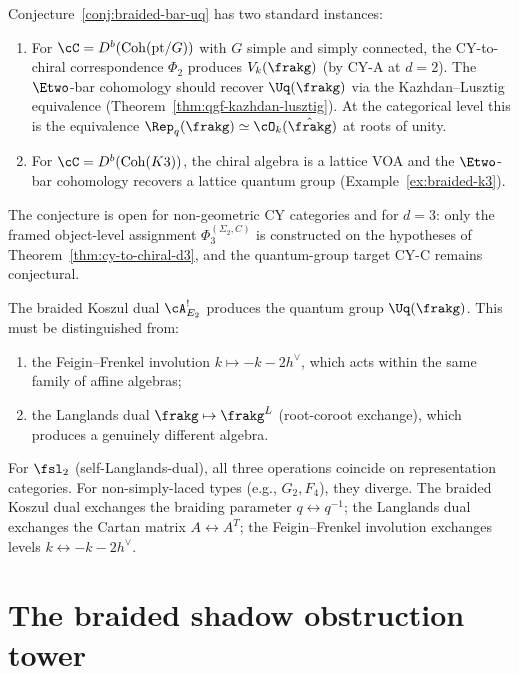 \begin{remark}
\label{rem:braided-bar-evidence}
Conjecture~\ref{conj:braided-bar-uq} has two standard instances:
\begin{enumerate}[label=(\roman*)]
 \item For $\cC = D^b(\mathrm{Coh}(\mathrm{pt}/G))$ with $G$ simple
 and simply connected, the CY-to-chiral correspondence $\Phi_2$ produces
 $V_k(\frakg)$ (by CY-A at $d = 2$). The $\Etwo$-bar cohomology
 should recover $\Uq(\frakg)$ via the Kazhdan--Lusztig equivalence
 (Theorem~\ref{thm:qgf-kazhdan-lusztig}). At the categorical level this
 is the equivalence $\Rep_q(\frakg) \simeq \cO_{k}(\hat{\frakg})$
 at roots of unity.
 \item For $\cC = D^b(\mathrm{Coh}(K3))$, the chiral algebra is a lattice
 VOA and the $\Etwo$-bar cohomology recovers a lattice quantum group
 (Example~\ref{ex:braided-k3}).
\end{enumerate}
The conjecture is open for non-geometric CY categories and for $d = 3$:
only the framed object-level assignment $\Phi_3^{(\Sigma_2,C)}$ is
constructed on the hypotheses of Theorem~\ref{thm:cy-to-chiral-d3}, and
the quantum-group target CY-C remains conjectural.
\end{remark}

\begin{remark}
\label{rem:braided-koszul-langlands}
The braided Koszul dual $\cA^!_{E_2}$ produces the quantum group
$\Uq(\frakg)$. This must be distinguished from:
\begin{enumerate}[label=(\alph*)]
 \item the Feigin--Frenkel involution $k \mapsto -k - 2h^\vee$, which
 acts within the same family of affine algebras;
 \item the Langlands dual $\frakg \mapsto \frakg^L$ (root-coroot
 exchange), which produces a genuinely different algebra.
\end{enumerate}
For $\fsl_2$ (self-Langlands-dual), all three operations coincide on
representation categories. For non-simply-laced types (e.g.,
$G_2, F_4$), they diverge. The braided Koszul dual exchanges the
braiding parameter $q \leftrightarrow q^{-1}$; the Langlands dual
exchanges the Cartan matrix $A \leftrightarrow A^T$; the Feigin--Frenkel
involution exchanges levels $k \leftrightarrow -k - 2h^\vee$.
\end{remark}


\section{The braided shadow obstruction tower}
\label{sec:braided-shadow-tower}

